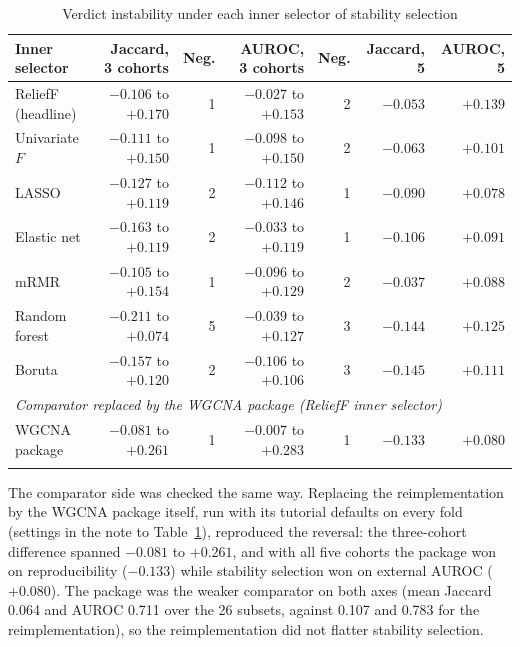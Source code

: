 \documentclass[pdflatex,sn-vancouver-num]{sn-jnl}
\theoremstyle{thmstyleone}
\theoremstyle{thmstyletwo}
\theoremstyle{thmstylethree}
\begin{document}
\begin{table}[h]
\caption{Verdict instability under each inner selector of stability selection}\label{tab:selectors}
\footnotesize
\setlength{\tabcolsep}{3pt}
\begin{tabular}{@{}lrrrrrr@{}}
\toprule
Inner selector & Jaccard, 3 cohorts & Neg. & AUROC, 3 cohorts & Neg. & Jaccard, 5 & AUROC, 5 \\
\midrule
ReliefF (headline) & $-0.106$ to $+0.170$ & 1 & $-0.027$ to $+0.153$ & 2 & $-0.053$ & $+0.139$ \\
Univariate $F$     & $-0.111$ to $+0.150$ & 1 & $-0.098$ to $+0.150$ & 2 & $-0.063$ & $+0.101$ \\
LASSO              & $-0.127$ to $+0.119$ & 2 & $-0.112$ to $+0.146$ & 1 & $-0.090$ & $+0.078$ \\
Elastic net        & $-0.163$ to $+0.119$ & 2 & $-0.033$ to $+0.119$ & 1 & $-0.106$ & $+0.091$ \\
mRMR               & $-0.105$ to $+0.154$ & 1 & $-0.096$ to $+0.129$ & 2 & $-0.037$ & $+0.088$ \\
Random forest      & $-0.211$ to $+0.074$ & 5 & $-0.039$ to $+0.127$ & 3 & $-0.144$ & $+0.125$ \\
Boruta             & $-0.157$ to $+0.120$ & 2 & $-0.106$ to $+0.106$ & 3 & $-0.145$ & $+0.111$ \\
\midrule
\multicolumn{7}{l}{\textit{Comparator replaced by the WGCNA package (ReliefF inner selector)}} \\
WGCNA package      & $-0.081$ to $+0.261$ & 1 & $-0.007$ to $+0.283$ & 1 & $-0.133$ & $+0.080$ \\
\botrule
\end{tabular}
\end{table}

The comparator side was checked the same way. Replacing the reimplementation by the WGCNA
package itself, run with its tutorial defaults on every fold (settings in the note to
Table~\ref{tab:selectors}), reproduced the reversal: the three-cohort difference spanned $-0.081$
to $+0.261$, and with all five cohorts the package won on reproducibility ($-0.133$) while
stability selection won on external AUROC ($+0.080$). The package was the weaker comparator on
both axes (mean Jaccard 0.064 and AUROC 0.711 over the 26 subsets, against 0.107 and 0.783 for
the reimplementation), so the reimplementation did not flatter stability selection.
\end{document}
